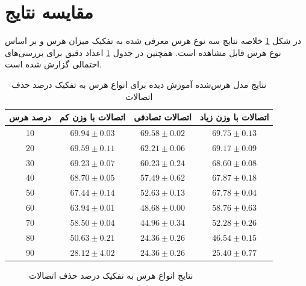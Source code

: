 \section{مقایسه نتایج}
در شکل \ref{ex_result} خلاصه نتایج سه نوع هرس معرفی شده به تفکیک میزان هرس و بر اساس نوع هرس قابل مشاهده است. همچنین در جدول \ref{res_all} اعداد دقیق برای بررسی‌های احتمالی گزارش شده است.
\begin{table}[ht]
	\caption{نتایج مدل هرس‌شده آموزش دیده برای انواع هرس به تفکیک درصد حذف اتصالات}
	\label{res_all}
	\centering
	\onehalfspacing
	\begin{tabular}{|c|c|c|c|}
		\hline درصد هرس & اتصالات با وزن کم &  اتصالات تصادفی & اتصالات با وزن زیاد\\ 
		\hline 10 & $69.94 \pm 0.03$ & $69.58 \pm 0.02$  &  $69.75 \pm 0.13$\\ 
		\hline 20 & $69.59 \pm 0.11$ & $62.21 \pm 0.06$  &  $69.17 \pm 0.09$\\ 
		\hline 30 & $69.23 \pm 0.07$ & $60.23 \pm 0.24$  &  $68.60 \pm 0.08$\\ 
		\hline 40 & $68.70 \pm 0.05$ & $57.49 \pm 0.62$  &  $67.87 \pm 0.18$\\ 
		\hline 50 & $67.44 \pm 0.14$ & $52.63 \pm 0.13$  &  $67.78 \pm 0.04$\\ 
		\hline 60 & $63.94 \pm 0.01$ & $48.68 \pm 0.00$  &  $58.76 \pm 0.63$\\ 
		\hline 70 & $58.50 \pm 0.04$ & $44.96 \pm 0.34$  &  $52.28 \pm 0.26$\\ 
		\hline 80 & $50.63 \pm 0.21$ & $24.36 \pm 0.26$  &  $46.54 \pm 0.15$\\ 
		\hline 90 & $28.12 \pm 4.02$ & $24.36 \pm 0.26$  &  $25.40 \pm 0.77$\\ 
		\hline 
	\end{tabular} 
\end{table}

\begin{figure}[H]
	\caption{نتایج انواع هرس به تفکیک درصد حذف اتصالات}
	\label{ex_result}
\end{figure}

